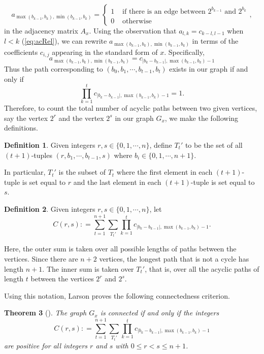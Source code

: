 \documentclass{amsart}
\newtheorem{theorem}{Theorem}[section]
\theoremstyle{definition}
\newtheorem{deff}[theorem]{Definition}
\theoremstyle{plain}
\numberwithin{theorem}{section}
\numberwithin{equation}{section}
\numberwithin{figure}{section}
\newcommand{\0}{\langle 0 \rangle }
\begin{document}
\[
a_{\max (b_{k-1}, b_k), \min (b_{k-1}, b_k)} = \begin{cases}
    1 & \text{ if there is an edge between } 2^{b_{k - 1}} \text{ and } 2^{b_k} \\
    0 & \text{ otherwise }
\end{cases},
\]
in the adjacency matrix $A_x$. Using the observation that $a_{l,k} = c_{k - l, l - 1}$ when $l < k$ (\ref{eq:acRel}), we can rewrite $a_{\max (b_{k-1}, b_k), \min (b_{k-1}, b_k)}$ in terms of the coefficients $c_{i,j}$ appearing in the standard form of $x$. Specifically,
\[
a_{\max (b_{k-1}, b_k), \min (b_{k-1}, b_k)} = c_{|b_k-b_{k-1}|, \max (b_{k-1}, b_k)-1}
\]
Thus the path corresponding to $(b_0, b_1, \cdots, b_{t - 1}, b_t)$ exists in our graph if and only if
\[
\prod_{k = 1}^{t} c_{|b_k-b_{k-1}|, \max (b_{k-1}, b_k)-1}  = 1. 
\]
Therefore, to count the total number of acyclic paths between two given vertices, say the vertex $2^{r}$ and the vertex $2^{s}$ in our graph $G_x$, we  make the following definitions.
\begin{deff} \label{def:T't}
    Given integers $r, s \in \{0,1, \cdots, n\}$, define $T_t'$ to be the set of all $(t + 1)$-tuples $(r, b_1, \cdots, b_{t -1 }, s)$ where $b_i \in \{ 0, 1, \cdots, n + 1\}$. 
\end{deff}
In particular, $T_t'$ is the subset of $T_t$ where the first element in each $(t + 1)$-tuple is set equal to $r$ and the last element in each $(t + 1)$-tuple is set equal to $s$.
\begin{deff} 
   Given integers $r, s \in \{0,1, \cdots, n\}$, let 
    \[
    { C(r, s)} : = \sum_{t = 1}^{n + 1} \sum_{T_t'} \prod_{k = 1}^t c_{|b_k-b_{k-1}|, \max (b_{k-1}, b_k)-1}.
    \]
\end{deff}
\color{black}
Here, the outer sum is taken over all possible lengths of paths between the vertices. Since there are $n + 2$ vertices, the longest path that is not a cycle has length $n + 1$. The inner sum is taken over $T_t'$, that is, over all the acyclic paths of length $t$ between the vertices $2^{r}$ and $2^{s}$.  

Using this notation, Larson proves the following connectedness criterion.
\begin{theorem}[{\cite[Theorem 1.1]{Larson22}}]
    The graph $G_x$ is connected if and only if the integers
    \[
    C(r,s) : = \sum_{t = 1}^{n + 1} \sum_{T_t'} \prod_{k = 1}^t c_{|b_k-b_{k-1}|, \max (b_{k-1}, b_k)-1}
    \]
    are positive for all integers $r$ and $s$ with $0 \leq r < s \leq n + 1$.
\end{theorem}
\end{document}
